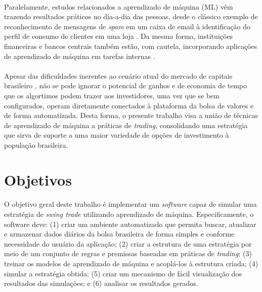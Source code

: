 \paragraph{} Paralelamente, estudos relacionados a aprendizado de máquina (ML) vêm trazendo resultados práticos no dia-a-dia das pessoas, desde o clássico exemplo de reconhecimento de mensagens de \textit{spam} em um caixa de email \cite{crawford2015survey} à identificação do perfil de consumo de clientes em uma loja \cite{dullaghan2017integration}. Da mesma forma, instituições financeiras e bancos centrais também estão, com cautela, incorporando aplicações de aprendizado de máquina em tarefas internas \cite{fernandez2019artificial}.

\paragraph{} Apesar das dificuldades inerentes ao cenário atual do mercado de capitais brasileiro \cite{ladd1965obstaculos}, não se pode ignorar o potencial de ganhos e de economia de tempo que os algortimos podem trazer aos investidores, uma vez que se bem configurados, operam diretamente conectados à plataforma da bolsa de valores e de forma automatizada. Desta forma, o presente trabalho visa a união de técnicas de aprendizado de máquina a práticas de \textit{trading}, consolidando uma estratégia que sirva de suporte a uma maior variedade de opções de investimento à população brasileira.



\FloatBarrier
\section{Objetivos}

\paragraph{} O objetivo geral deste trabalho é implementar um \textit{software} capaz de simular uma estratégia de \textit{swing trade} utilizando aprendizado de máquina. Especificamente, o software deve: (1) criar um ambiente automatizado que permita buscar, atualizar e armazenar dados diários da bolsa brasileira de forma simples e conforme necessidade do usuário da aplicação; (2) criar a estrutura de uma estratégia por meio de um conjunto de regras e premissas baseadas em práticas de \textit{trading}; (3) treinar os modelos de aprendizado de máquina e acoplá-los à estrutura criada; (4) simular a estratégia obtida; (5) criar um mecanismo de fácil visualização dos resultados das simulações; e (6) analisar os resultados gerados.



